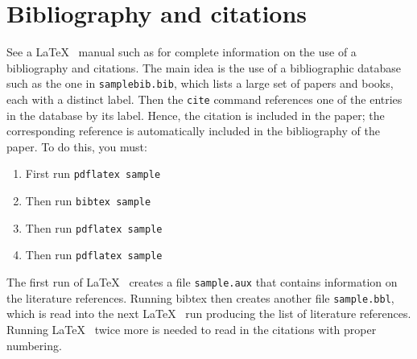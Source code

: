 \section{Bibliography and citations}
See a \LaTeX~ manual such as \cite{go-mi-sa:latex} for complete information on the use of a bibliography and citations. The main idea is the use of a bibliographic database such as the one in {\tt samplebib.bib}, which lists a large set of papers and books, each with a distinct label.  Then the  {\tt cite} command references one of the entries in the database by its label.  Hence, the citation is included in the paper; the corresponding reference is automatically included in the bibliography of the paper.  To do this, you must:
\begin{enumerate}
\item First run {\tt pdflatex sample}
\item Then run {\tt bibtex sample}
\item Then run {\tt pdflatex sample}
\item Then run {\tt pdflatex sample}
\end{enumerate}

The first run of \LaTeX~ creates a file {\tt sample.aux}
that contains information on the literature references.
Running bibtex then creates another file {\tt sample.bbl}, which is read into
the next \LaTeX~ run producing the list of literature references.  
Running \LaTeX~ twice more is needed to read in the citations with proper numbering. 

